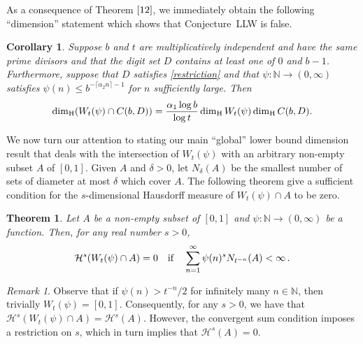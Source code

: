 \documentclass[12pt]{article}
\newtheorem{theorem}{Theorem}[section]
\newtheorem{corollary}{Corollary}[section]
\theoremstyle{definition}
\theoremstyle{remark}
\newtheorem{remark}{{Remark}}[section]
\begin{document}
As a consequence of Theorem $\ref{12}$, we immediately obtain the following ``dimension'' statement which shows that Conjecture~LLW is false. 


\begin{corollary}\label{16}
Suppose $b$ and $t$ are multiplicatively independent and have the same prime divisors and that the digit set $D$ contains at least one of $0$ and $b-1$.   Furthermore, suppose that $D$ satisfies 
\eqref{restriction} and that $\psi:\mathbb{N}\to(0,\infty)$  satisfies $\psi(n)\le b^{-\lceil\alpha_{2}n\rceil-1}$  for $n$ sufficiently large.   Then  
\begin{equation*}
\dim_{\rm H}(W_{t}(\psi)\cap C(b,D))=\frac{\alpha_{1}\log b}{\log t}\dim_{\rm H}W_{t}(\psi)\dim_{\rm H}C(b,D).
\end{equation*}
\end{corollary}



We now turn our attention to stating our main ``global'' lower bound dimension result  that deals with  the intersection of $W_{t}(\psi)$ with an  arbitrary non-empty subset $A$ of $[0,1]$. Given $A$ and $\delta > 0$,  let $N_{\delta}(A)$ be the smallest
number of sets of diameter at most $\delta$ which cover $A$. The following theorem give a sufficient condition for the $s$-dimensional Hausdorff measure of $W_{t}(\psi)\cap A$ to be zero.


\begin{theorem}\label{11}
Let $A$ be a non-empty subset of $[0,1]$ and   $\psi:\mathbb{N}\to(0,\infty)$ be a function. Then, for any real number $s>0$, 
\begin{equation*}
\mathcal{H}^{s}(W_{t}(\psi)\cap A)=0  \quad  {\rm if}  \quad  \sum\limits_{n=1}^{\infty}\psi(n)^{s}N_{t^{-n}}(A)<\infty  \, . 
\end{equation*}
\end{theorem}



\bigskip 


\begin{remark}
 Observe that if $\psi(n)>t^{-n}/2$ for infinitely many $n\in\mathbb{N}$, then trivially $W_{t}(\psi)=[0,1]$. Consequently, for any $s > 0$, we have that  $\mathcal{H}^{s}(  W_{t}(\psi)\cap A) =  \mathcal{H}^{s}(A)   $.   However, the convergent sum condition imposes  a restriction on $s$, which in turn implies that $\mathcal{H}^{s}(A) = 0$.  
\end{remark}


\end{document}
